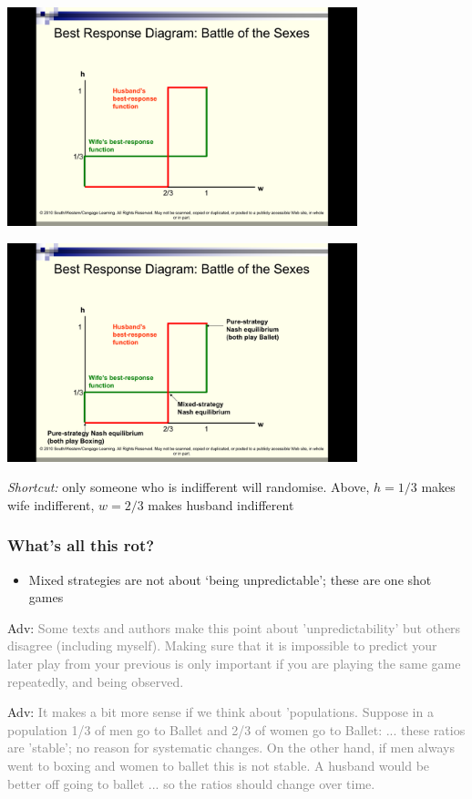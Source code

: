 \documentclass[]{article}
\providecommand{\tightlist}{%
  \setlength{\itemsep}{0pt}\setlength{\parskip}{0pt}}
\begin{document}
\includegraphics[height=2.5in]{picsfigs/bosbr2.png}

\includegraphics[height=2.5in]{picsfigs/bosbr3.png}

\emph{Shortcut:} only someone who is indifferent will randomise. Above, \(h=1/3\) makes wife indifferent, \(w=2/3\) makes husband indifferent

\hypertarget{whats-all-this-rot}{%
\subsubsection{What's all this rot?}\label{whats-all-this-rot}}

\begin{itemize}
\tightlist
\item
  Mixed strategies are not about `being unpredictable'; these are one shot games
\end{itemize}

\textcolor{RawSienna}{Adv:} \textcolor{gray}{Some texts and authors make this point about 'unpredictability' but others disagree (including myself). Making sure that it is impossible to predict your later play from your previous is only important if you are playing the same game repeatedly, and being observed.}

\textcolor{RawSienna}{Adv:} \textcolor{gray}{It makes a bit more sense if we think about 'populations.
Suppose in a population 1/3 of men go to Ballet and 2/3 of women go to Ballet:
... these ratios are 'stable'; no reason for systematic changes.
On the other hand, if men always went to boxing and women to ballet this is not stable. A husband would be better off going to ballet ... so the ratios should change over time.}
\end{document}
